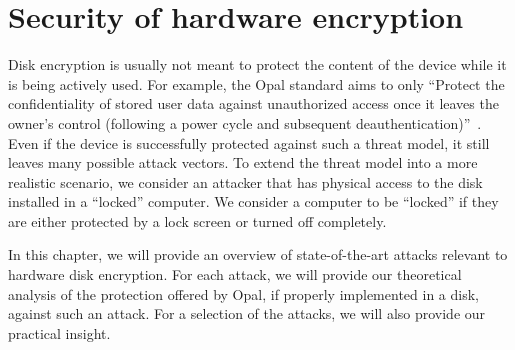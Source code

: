 \chapter{Security of hardware encryption}

Disk encryption is usually not meant to protect the content of the device while it is being actively used.
For example, the Opal standard aims to only \enquote{Protect the confidentiality of stored user data against unauthorized access once it leaves the owner's control (following a power cycle and subsequent deauthentication)}~\cite{tcg-opal2}.
Even if the device is successfully protected against such a threat model, it still leaves many possible attack vectors.
To extend the threat model into a more realistic scenario, we consider an attacker that has physical access to the disk installed in a ``locked'' computer. We consider a computer to be ``locked'' if they are either protected by a lock screen or turned off completely.







In this chapter, we will provide an overview of state-of-the-art attacks relevant to hardware disk encryption. For each attack, we will provide our theoretical analysis of the protection offered by Opal, if properly implemented in a disk, against such an attack. For a selection of the attacks, we will also provide our practical insight.



